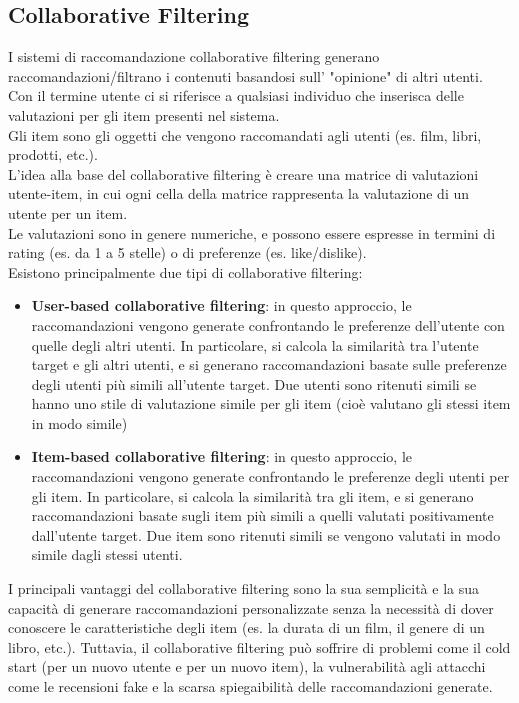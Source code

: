 \subsection{Collaborative Filtering}
I sistemi di raccomandazione collaborative filtering generano raccomandazioni/filtrano i contenuti basandosi sull' "opinione" di altri utenti.\\ Con il termine utente ci si riferisce a qualsiasi individuo che inserisca delle valutazioni per gli item presenti nel sistema. \\ Gli item sono gli oggetti che vengono raccomandati agli utenti (es. film, libri, prodotti, etc.).\\
L'idea alla base del collaborative filtering è creare una matrice di valutazioni utente-item, in cui ogni cella della matrice rappresenta la valutazione di un utente per un item.\\ Le valutazioni sono in genere numeriche, e possono essere espresse in termini di rating (es. da 1 a 5 stelle) o di preferenze (es. like/dislike).\\
Esistono principalmente due tipi di collaborative filtering:
\begin{itemize}
    \item \textbf{User-based collaborative filtering}: in questo approccio, le raccomandazioni vengono generate confrontando le preferenze dell'utente con quelle degli altri utenti. In particolare, si calcola la similarità tra l'utente target e gli altri utenti, e si generano raccomandazioni basate sulle preferenze degli utenti più simili all'utente target. Due utenti sono ritenuti simili se hanno uno stile di valutazione simile per gli item (cioè valutano gli stessi item in modo simile)
    \item \textbf{Item-based collaborative filtering}: in questo approccio, le raccomandazioni vengono generate confrontando le preferenze degli utenti per gli item. In particolare, si calcola la similarità tra gli item, e si generano raccomandazioni basate sugli item più simili a quelli valutati positivamente dall'utente target. Due item sono ritenuti simili se vengono valutati in modo simile dagli stessi utenti.
\end{itemize}
I principali vantaggi del collaborative filtering sono la sua semplicità e la sua capacità di generare raccomandazioni personalizzate senza la necessità di dover conoscere le caratteristiche degli item (es. la durata di un film, il genere di un libro, etc.). Tuttavia, il collaborative filtering può soffrire di problemi come il cold start (per un nuovo utente e per un nuovo item), la vulnerabilità agli attacchi come le recensioni fake e la scarsa spiegaibilità delle raccomandazioni generate.\\



